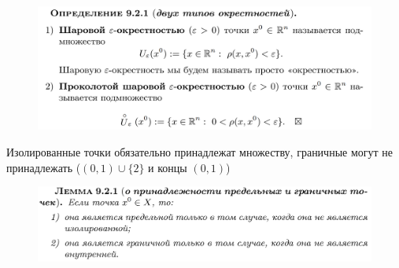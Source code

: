 \documentclass{article}
\begin{document}
\begin{figure}[h!]
    \centering
    \vspace{-1cm}
\end{figure}
\begin{figure}[h!]
    \centering
    \includegraphics[width=\textwidth]{7.png}
    \vspace{-1cm}
\end{figure}
\newpage
\begin{figure}[h!]
    \centering
\end{figure}
Изолированные точки обязательно принадлежат множеству, граничные могут не принадлежать ($(0,1)\cup \{2\}$ и концы $(0,1)$)
\begin{figure}[h!]
    \centering
    \includegraphics[width=\textwidth]{8.png}
    \vspace{-1cm}
\end{figure}
\end{document}
